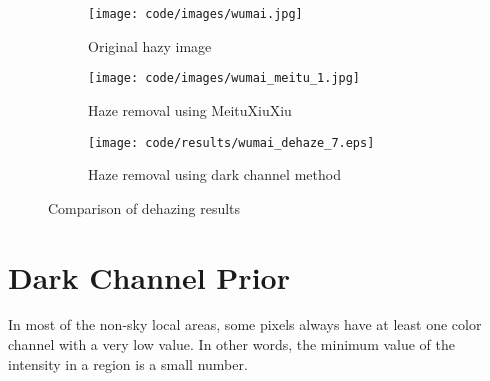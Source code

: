 \documentclass[journal,comsoc]{IEEEtran}
\begin{document}

\begin{figure}[!hbt]
  \centering
  \begin{subfigure}{0.5\textwidth}
    \centering
    \texttt{[image: code/images/wumai.jpg]}
    \caption{Original hazy image}
    \label{subfig:hazy-image}
  \end{subfigure}
  \begin{subfigure}{.5\textwidth}
    \centering
    \texttt{[image: code/images/wumai\_meitu\_1.jpg]}
    \caption{Haze removal using MeituXiuXiu}
    \label{subfig:haze-removal-using-meituxiuxiu}
  \end{subfigure}
  \begin{subfigure}{.5\textwidth}
    \centering
    \texttt{[image: code/results/wumai\_dehaze\_7.eps]}
    \caption{Haze removal using dark channel method}
    \label{subfig:haze-removal-using-dark-channel-methods}
  \end{subfigure}
  \caption{Comparison of dehazing results}
  \label{fig:comparison-of-dehazing-results}
\end{figure}





\section{Dark Channel Prior}
\label{sec:dark-channel-prior}
In most of the non-sky local areas, some pixels always have at least one color channel with a very low value.
In other words, the minimum value of the intensity in a region is a small number.
\end{document}

